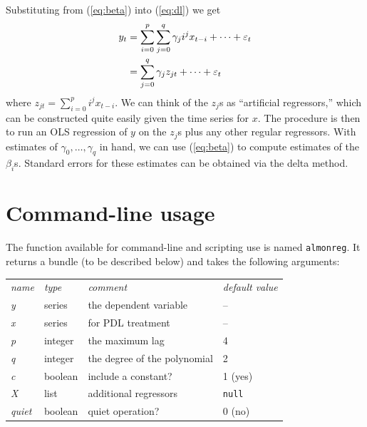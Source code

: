 \documentclass{article}
\begin{document}
Substituting from (\ref{eq:beta}) into (\ref{eq:dl}) we get
%
\begin{align}
y_t &= \sum_{i=0}^p \sum_{j=0}^q \gamma_j i^j x_{t-i} + \cdots +
\varepsilon_t \notag \\
 &= \sum_{j=0}^q \gamma_j z_{jt} + \cdots + \varepsilon_t
\end{align}
%
where $z_{jt} = \sum_{i=0}^p i^j x_{t-i}$. We can think of the $z_j$s
as ``artificial regressors,'' which can be constructed quite easily
given the time series for $x$. The procedure is then to run an OLS
regression of $y$ on the $z_j$s plus any other regular regressors.
With estimates of $\gamma_0,\dots,\gamma_q$ in hand, we can use
(\ref{eq:beta}) to compute estimates of the $\beta_i$s. Standard
errors for these estimates can be obtained via the delta method.

\section{Command-line usage}

The function available for command-line and scripting use is
named \texttt{almonreg}. It returns a bundle (to be described below)
and takes the following arguments:

\begin{center}
\begin{tabular}{llll}
  \textit{name} & \textit{type} & \textit{comment} & \textit{default value} \\[4pt]
  \textsl{y} & series & the dependent variable & --  \\ 
  \textsl{x} & series & for PDL treatment &  -- \\
  \textsl{p} & integer & the maximum lag & 4\\
  \textsl{q} & integer & the degree of the polynomial & 2\\
  \textsl{c} & boolean & include a constant? & 1 (yes)\\
  \textsl{X} & list & additional regressors & \texttt{null} \\
  \textsl{quiet} & boolean & quiet operation? & 0 (no)
\end{tabular}
\end{center}
\end{document}
